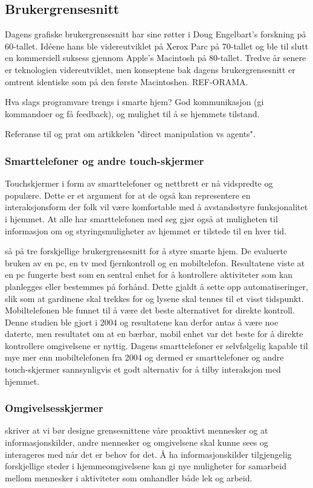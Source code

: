 \subsection{Brukergrensesnitt}
{\color{blue}
Dagens grafiske brukergrensesnitt har sine røtter i Doug Engelbart's forskning på 60-tallet. Idéene hans ble videreutviklet på Xerox Parc på 70-tallet og ble til slutt en kommersiell suksess gjennom Apple's Macintosh på 80-tallet. Tredve år senere er teknologien videreutviklet, men konseptene bak dagens brukergrensesnitt er omtrent identiske som på den første Macintoshen. REF-ORAMA.

Hva slags programvare trengs i smarte hjem?
God kommunikasjon (gi kommandoer og få feedback), og mulighet til å se hjemmets tilstand.

Referanse til og prat om artikkelen "direct manipulation vs agents".

\subsubsection*{Smarttelefoner og andre touch-skjermer}
Touchskjermer i form av smarttelefoner og nettbrett er nå vidspredte og populære. Dette er et argument for at de også kan representere en interaksjonsform der folk vil være komfortable med å avstandsstyre funksjonalitet i hjemmet. At alle har smarttelefonen med seg gjør også at muligheten til informasjon om og styringsmuligheter av hjemmet er tilstede til en hver tid.

\citet{koskela04} så på tre forskjellige brukergrensesnitt for å styre smarte hjem. De evaluerte bruken av en pc, en tv med fjernkontroll og en mobiltelefon. Resultatene viste at en pc fungerte best som en sentral enhet for å kontrollere aktiviteter som kan planlegges eller bestemmes på forhånd. Dette gjaldt å sette opp automatiseringer, slik som at gardinene skal trekkes for og lysene skal tennes til et visst tidspunkt. Mobiltelefonen ble funnet til å være det beste alternativet for direkte kontroll. Denne studien ble gjort i 2004 og resultatene kan derfor antas å være noe daterte, men resultatet om at en bærbar, mobil enhet var det beste for å direkte kontrollere omgivelsene er nyttig. Dagens smarttelefoner er selvfølgelig kapable til mye mer enn mobiltelefonen fra 2004 og dermed er smarttelefoner og andre touch-skjermer sannsynligvis et godt alternativ for å tilby interaksjon med hjemmet.

\subsubsection*{Omgivelsesskjermer}
\citet{rogers06} skriver at vi bør designe grensesnittene våre proaktivt mennesker og at informasjonskilder, andre mennesker og omgivelsene skal kunne sees og interageres med når det er behov for det. Å ha informasjonskilder tilgjengelig forskjellige steder i hjemmeomgivelsene kan gi nye muligheter for samarbeid mellom mennesker i aktiviteter som omhandler både lek og arbeid.

}
